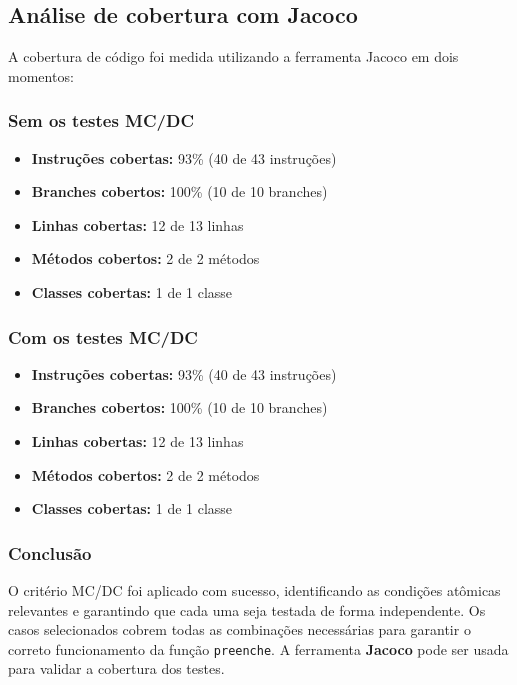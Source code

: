 \documentclass[
  letterpaper,
  DIV=11,
  numbers=noendperiod]{scrartcl}
\providecommand{\tightlist}{%
  \setlength{\itemsep}{0pt}\setlength{\parskip}{0pt}}
\begin{document}
\subsection{Análise de cobertura com
Jacoco}\label{anuxe1lise-de-cobertura-com-jacoco}

A cobertura de código foi medida utilizando a ferramenta Jacoco em dois
momentos:

\subsubsection{Sem os testes MC/DC}\label{sem-os-testes-mcdc}

\begin{itemize}
\tightlist
\item
  \textbf{Instruções cobertas:} 93\% (40 de 43 instruções)
\item
  \textbf{Branches cobertos:} 100\% (10 de 10 branches)
\item
  \textbf{Linhas cobertas:} 12 de 13 linhas
\item
  \textbf{Métodos cobertos:} 2 de 2 métodos
\item
  \textbf{Classes cobertas:} 1 de 1 classe
\end{itemize}

\subsubsection{Com os testes MC/DC}\label{com-os-testes-mcdc}

\begin{itemize}
\tightlist
\item
  \textbf{Instruções cobertas:} 93\% (40 de 43 instruções)
\item
  \textbf{Branches cobertos:} 100\% (10 de 10 branches)
\item
  \textbf{Linhas cobertas:} 12 de 13 linhas
\item
  \textbf{Métodos cobertos:} 2 de 2 métodos
\item
  \textbf{Classes cobertas:} 1 de 1 classe
\end{itemize}

\subsubsection{Conclusão}\label{conclusuxe3o}

O critério MC/DC foi aplicado com sucesso, identificando as condições
atômicas relevantes e garantindo que cada uma seja testada de forma
independente. Os casos selecionados cobrem todas as combinações
necessárias para garantir o correto funcionamento da função
\texttt{preenche}. A ferramenta \textbf{Jacoco} pode ser usada para
validar a cobertura dos testes.
\end{document}
